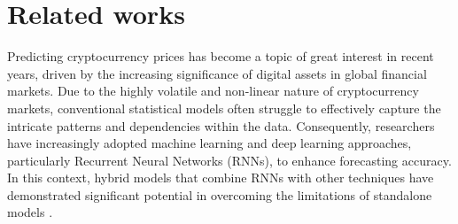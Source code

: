 \documentclass{dsfe}
\begin{document}
\section{Related works}
Predicting cryptocurrency prices has become a topic of great interest in recent years, driven by the increasing significance of digital assets in global financial markets. Due to the highly volatile and non-linear nature of cryptocurrency markets, conventional statistical models often struggle to effectively capture the intricate patterns and dependencies within the data. Consequently, researchers have increasingly adopted machine learning and deep learning approaches, particularly Recurrent Neural Networks (RNNs), to enhance forecasting accuracy. In this context, hybrid models that combine RNNs with other techniques have demonstrated significant potential in overcoming the limitations of standalone models \citep{oyewola2022, ferdiansyah2023, garcia2024}.
\end{document}
